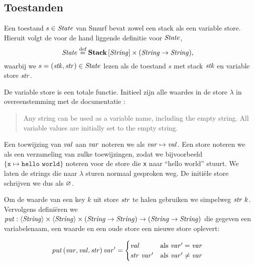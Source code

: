 \subsection{Toestanden}
\label{sec:def:state}

Een toestand $s\in\mathit{State}$ van Smurf bevat zowel een stack als een variable
store. Hieruit volgt de voor de hand liggende definitie voor $\mathit{State}$,
$$\mathit{State} \stackrel{\text{def}}{=} \mathbf{Stack}\left[\mathit{\mathit{String}}\right] \times (\mathit{String} \to \mathit{String}),$$
waarbij we $s=(\mathit{stk},\mathit{str})\in\mathit{State}$ lezen als de toestand $s$ met stack $\mathit{stk}$
en variable store $\mathit{str}$.

De variable store is een totale functie. Initieel zijn alle waardes in de store
$\lambda$ in overeenstemming met de documentatie \cite{safalra}:

\begin{quote}
	Any string can be used as a variable name, including the empty string. All
	variable values are initially set to the empty string.
\end{quote}

Een toewijzing van $\mathit{val}$ aan $\mathit{var}$ noteren we als $\mathit{var}\mapsto\mathit{val}$. Een
store noteren we als een verzameling van zulke toewijzingen, zodat we bijvoorbeeld
$\{\texttt{x}\mapsto\texttt{hello world}\}$ noteren voor de store die
\texttt{x} naar ``hello world'' stuurt. We laten de strings die naar $\lambda$
sturen normaal gesproken weg. De initiële store schrijven we dus als
$\varnothing$.

Om de waarde van een key $k$ uit store $\mathit{str}$ te halen gebruiken we simpelweg
$\mathit{str}~k$. Vervolgens definiëren we $\mathit{put}:\langle\mathit{String}\rangle \times \langle\mathit{String}\rangle \times
(\mathit{String}\to\mathit{String}) \to (\mathit{String}\to\mathit{String})$ die gegeven een variabelenaam, een
waarde en een oude store een nieuwe store oplevert:

$$
	\mathit{put}\left(\mathit{var}, \mathit{val}, \mathit{str}\right) \mathit{var}' =
		\begin{cases}
			\mathit{val}       & \text{als $\mathit{var}'=\mathit{var}$} \\
			\mathit{str}~\mathit{var}' & \text{als $\mathit{var}'\ne\mathit{var}$}
		\end{cases}
$$

